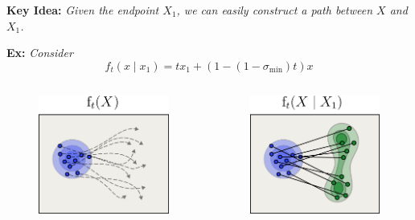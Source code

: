 \documentclass{beamer}
\begin{document}
\begin{frame}
    \begin{blackblock}
    \textbf{Key Idea:} \emph{Given the endpoint \( X_{1} \), we can easily construct a path between \( X \) and \( X_{1} \).}
    \end{blackblock}
    \textbf{Ex:} \emph{Consider} \[ f_t(x \mid x_{1}) = tx_{1} + (1 - (1 - \sigma_{\mathrm{min}})t)x \]
    \vskip 3pt
    \begin{columns}
        \begin{column}{0.49\linewidth}
        \begin{figure}
            \centering
            \includegraphics[width=0.8\linewidth]{figures/marginal-path.png}
        \end{figure}
        \end{column}
        \begin{column}{0.49\linewidth}
        \begin{figure}
            \centering
            \includegraphics[width=0.8\linewidth]{figures/conditional-path.png}
        \end{figure}
        \end{column}
    \end{columns}
\end{frame}
\end{document}

